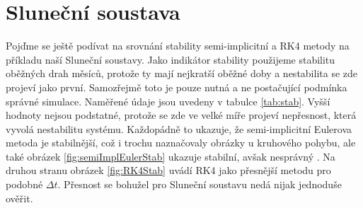 \section{Sluneční soustava}
Pojďme se ještě podívat na srovnání stability semi-implicitní a RK4 metody na příkladu naší Sluneční soustavy. Jako indikátor stability použijeme stabilitu oběžných drah měsíců, protože ty mají nejkratší oběžné doby a nestabilita se zde projeví jako první. Samozřejmě toto je pouze nutná a ne postačující podmínka správné simulace. Naměřené údaje jsou uvedeny v tabulce \ref{tab:stab}. Vyšší hodnoty nejsou podstatné, protože se zde ve velké míře projeví nepřesnost, která vyvolá nestabilitu systému. Každopádně to ukazuje, že semi-implicitní Eulerova metoda je stabilnější, což i trochu naznačovaly obrázky u kruhového pohybu, ale také obrázek \ref{fig:semiImplEulerStab} ukazuje stabilní, avšak nesprávný . Na druhou stranu obrázek \ref{fig:RK4Stab} uvádí RK4 jako přesnější metodu pro podobné $ \Delta t $. Přesnost se bohužel pro Sluneční soustavu nedá nijak jednoduše ověřit. 


